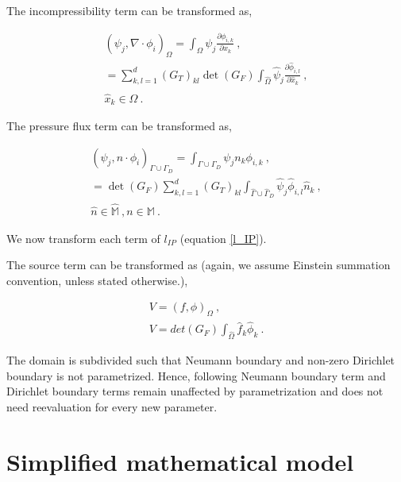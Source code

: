 \documentclass[a4paper,oneside,openright,spanish,english]{book}
\begin{document}
The incompressibility term can be transformed as,

\begin{equation}\label{affine_incompressibility_term}
\begin{split}
(\psi_j, \nabla \cdot \phi_i)_{\Omega} = \int_{\Omega} \psi_j \frac{\partial \phi_{i,k}}{\partial x_k} \ , \\
= \sum_{k,l=1}^{d} (G_T)_{kl} \det(G_F) \int_{\hat{\Omega}} \hat{\psi}_j \frac{\partial \hat{\phi}_{i,l}}{\partial \hat{x}_k} \ , \\
\hat{x}_k \in \hat{\Omega} \ .
\end{split}
\end{equation}

The pressure flux term can be transformed as,

\begin{equation}\label{affine_pressure_flux_term}
\begin{split}
(\psi_j,n \cdot \phi_i)_{\Gamma \cup \Gamma_D} = \int_{\Gamma \cup \Gamma_D} \psi_j n_k \phi_{i,k} \ , \\
 = \det(G_F) \sum_{k,l=1}^{d} (G_T)_{kl} \int_{\hat{\Gamma} \cup \hat{\Gamma}_D} \hat{\psi}_j \hat{\phi}_{i,l} \hat{n}_k \ , \\
\hat{n} \in \hat{\mathbb{M}} \ , n \in \mathbb{M} \ .
\end{split}
\end{equation}

We now transform each term of $l_{IP}$ (equation \eqref{l_IP}).

The source term can be transformed as (again, we assume Einstein summation convention, unless stated otherwise.),

\begin{equation}\label{affine_source_term}
\begin{split}
V = (f,\phi)_{\Omega} \ , \\
V = det(G_F) \int_{\hat{\Omega}} \hat{f}_k \hat{\phi}_k \ .
\end{split}
\end{equation}

The domain is subdivided such that Neumann boundary and non-zero Dirichlet boundary is not parametrized. Hence, following Neumann boundary term and Dirichlet boundary terms remain unaffected by parametrization and does not need reevaluation for every new parameter.

\section{Simplified mathematical model}
\end{document}
